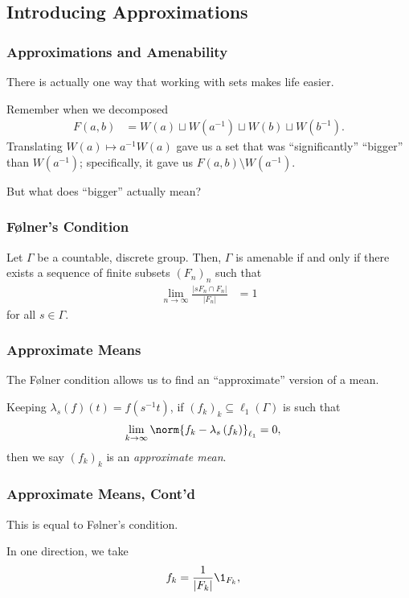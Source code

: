 \documentclass{beamer-custom}
\begin{document}
\subsection{Introducing Approximations}%
\begin{frame}
  \frametitle{Approximations and Amenability}
  There is actually one way that working with sets makes life easier.\pause\newline

  Remember when we decomposed
  \begin{align*}
    F(a,b) &= W(a) \sqcup W\left( a^{-1} \right) \sqcup W\left( b \right) \sqcup W\left( b^{-1} \right).
  \end{align*}
  Translating $W\left( a \right) \mapsto a^{-1}W\left( a \right)$ gave us a set that was ``significantly'' ``bigger'' than $W\left( a^{-1} \right)$; specifically, it gave us $F\left( a,b \right) \setminus W\left( a^{-1} \right)$.\pause\newline

  But what does ``bigger'' actually mean?
\end{frame}
\begin{frame}
  \frametitle{Følner's Condition}
  \begin{theorem}
    Let $\Gamma$ be a countable, discrete group. Then, $\Gamma$ is amenable if and only if there exists a sequence of finite subsets $\left( F_n \right)_n$ such that
    \begin{align*}
      \lim_{n\rightarrow\infty} \frac{\left\vert sF_n \cap F_n \right\vert}{\left\vert F_n \right\vert} &= 1
    \end{align*}
    for all $s\in\Gamma$.
  \end{theorem}
\end{frame}
\begin{frame}
  \frametitle{Approximate Means}
  The Følner condition allows us to find an ``approximate'' version of a mean.\pause\newline

  Keeping $\lambda_s(f)(t) = f\left( s^{-1}t \right)$, if $\left( f_k \right)_k\subseteq \ell_1\left( \Gamma \right)$ is such that
  \begin{align*}
    \lim_{k\rightarrow\infty}\norm{f_k - \lambda_s\left( f_k \right)}_{\ell_1} &= 0,
  \end{align*}
  then we say $\left( f_k \right)_k$ is an \textit{approximate mean}.
  \end{frame}
  \begin{frame}
  \frametitle{Approximate Means, Cont'd}
  This is equal to Følner's condition.\newline

  In one direction, we take
  \begin{align*}
    f_k &= \frac{1}{\left\vert F_k \right\vert}\1_{F_k},
  \end{align*}
\end{frame}
\end{document}
